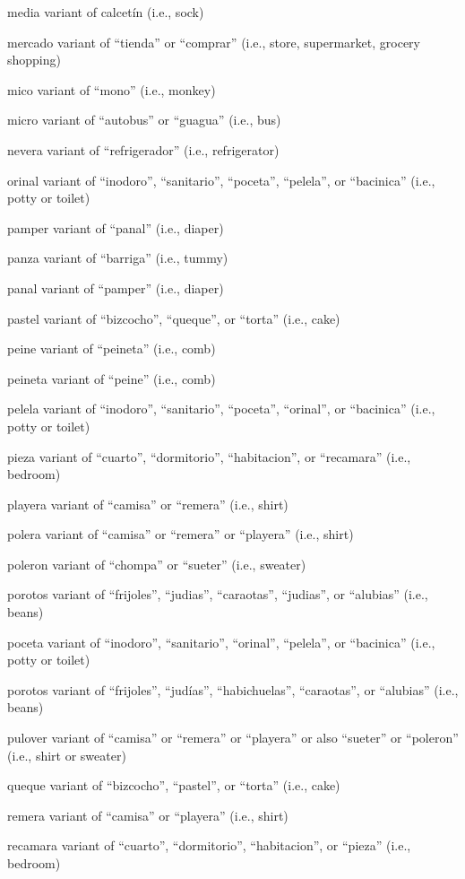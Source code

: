 \documentclass[
]{book}
\begin{document}
media
variant of calcetín (i.e., sock)

mercado
variant of ``tienda'' or ``comprar'' (i.e., store, supermarket, grocery shopping)

mico
variant of ``mono'' (i.e., monkey)

micro
variant of ``autobus'' or ``guagua'' (i.e., bus)

nevera
variant of ``refrigerador'' (i.e., refrigerator)

orinal
variant of ``inodoro'', ``sanitario'', ``poceta'', ``pelela'', or ``bacinica'' (i.e., potty or toilet)

pamper
variant of ``panal'' (i.e., diaper)

panza
variant of ``barriga'' (i.e., tummy)

panal
variant of ``pamper'' (i.e., diaper)

pastel
variant of ``bizcocho'', ``queque'', or ``torta'' (i.e., cake)

peine
variant of ``peineta'' (i.e., comb)

peineta
variant of ``peine'' (i.e., comb)

pelela
variant of ``inodoro'', ``sanitario'', ``poceta'', ``orinal'', or ``bacinica'' (i.e., potty or toilet)

pieza
variant of ``cuarto'', ``dormitorio'', ``habitacion'', or ``recamara'' (i.e., bedroom)

playera
variant of ``camisa'' or ``remera'' (i.e., shirt)

polera
variant of ``camisa'' or ``remera'' or ``playera'' (i.e., shirt)

poleron
variant of ``chompa'' or ``sueter'' (i.e., sweater)

porotos
variant of ``frijoles'', ``judias'', ``caraotas'', ``judias'', or ``alubias'' (i.e., beans)

poceta
variant of ``inodoro'', ``sanitario'', ``orinal'', ``pelela'', or ``bacinica'' (i.e., potty or toilet)

porotos
variant of ``frijoles'', ``judías'', ``habichuelas'', ``caraotas'', or ``alubias'' (i.e., beans)

pulover
variant of ``camisa'' or ``remera'' or ``playera'' or also ``sueter'' or ``poleron'' (i.e., shirt or sweater)

queque
variant of ``bizcocho'', ``pastel'', or ``torta'' (i.e., cake)

remera
variant of ``camisa'' or ``playera'' (i.e., shirt)

recamara
variant of ``cuarto'', ``dormitorio'', ``habitacion'', or ``pieza'' (i.e., bedroom)
\end{document}

